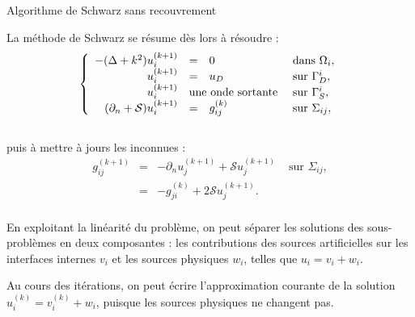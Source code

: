 \documentclass[
mode=present,    %
paper=a4paper,   %
orient=landscape,
display=slides,   %
size=10pt,
style=romain   %
]{powerdot}
\begin{document}
\begin{slide}[toc=]{Algorithme de Schwarz sans recouvrement}

La méthode de Schwarz se résume dès lors à résoudre : 
\begin{equation}
\left\{\begin{array}{rcll}
-(\Delta + k^2) u_i^{(k+1)} & = & 0 & \text{ dans } \Omega_i,\\
u_i^{(k+1)} & = & u_D & \text{ sur } \Gamma_D^i,\\
u_i^{(k+1)} & \multicolumn{2}{l}{\text{une onde sortante}} & \text{ sur } \Gamma_S^i,\\
(\partial_n + \mathcal{S}) u_i^{(k+1)} & = &  g_{ij}^{(k)} & \text{ sur } \Sigma_{ij},\\
\end{array}\right.
\label{eq:ddmSubprobIterate}
\end{equation}\\
puis à mettre à jours les inconnues :
\begin{equation}
\begin{array}{rcll}
g_{ij}^{(k+1)} & = & - \partial_n u_j^{(k+1)} + \mathcal{S} u_j^{(k+1)} &
\text{ sur } \Sigma_{ij},\\ 
& = & - g_{ji}^{(k)} + 2 \mathcal{S} u_j^{(k+1)}. & \\
\end{array}
\label{eq:ddmUpdate}
\end{equation}

En exploitant la linéarité du problème, on peut séparer les solutions
des sous-problèmes en deux composantes : les contributions
des sources artificielles sur les interfaces internes $v_i$ et les sources physiques
$w_i$, telles que $u_i=v_i+w_i$. 

\bigskip
Au cours des itérations, on peut écrire l'approximation courante de la
solution $u_i^{(k)}=v_i^{(k)}+w_i$, puisque les sources physiques ne
changent pas. 
\end{slide}
\end{document}
